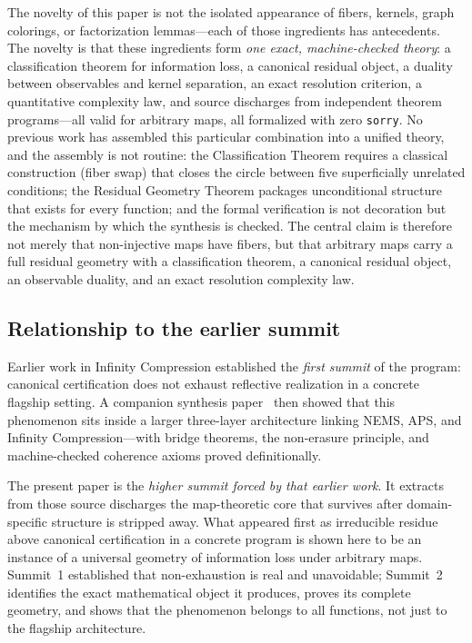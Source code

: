 \documentclass[11pt,a4paper]{article}
\theoremstyle{plain}
\theoremstyle{definition}
\theoremstyle{remark}
\begin{document}
The novelty of this paper is not the isolated appearance of fibers, kernels,
graph colorings, or factorization lemmas---each of those ingredients has
antecedents. The novelty is that these ingredients form \emph{one exact,
machine-checked theory}: a classification theorem for information loss, a
canonical residual object, a duality between observables and kernel separation,
an exact resolution criterion, a quantitative complexity law, and source
discharges from independent theorem programs---all valid for arbitrary maps,
all formalized with zero \texttt{sorry}. No previous work has assembled this
particular combination into a unified theory, and the assembly is not routine:
the Classification Theorem requires a classical construction (fiber swap) that
closes the circle between five superficially unrelated conditions; the
Residual Geometry Theorem packages unconditional structure that exists for
every function; and the formal verification is not decoration but the
mechanism by which the synthesis is checked. The central claim is therefore
not merely that non-injective maps have fibers, but that arbitrary maps carry
a full residual geometry with a classification theorem, a canonical residual
object, an observable duality, and an exact resolution complexity law.

\subsection{Relationship to the earlier summit}

Earlier work in Infinity Compression established the \emph{first summit} of
the program: canonical certification does not exhaust reflective realization
in a concrete flagship setting. A companion synthesis paper~\cite{Spivack2026-Strata} then showed that
this phenomenon sits inside a larger three-layer architecture linking NEMS,
APS, and Infinity Compression---with bridge theorems, the non-erasure
principle, and machine-checked coherence axioms proved definitionally.

The present paper is the \emph{higher summit forced by that earlier work}.
It extracts from those source discharges the map-theoretic core that survives
after domain-specific structure is stripped away. What appeared first as
irreducible residue above canonical certification in a concrete program is
shown here to be an instance of a universal geometry of information loss
under arbitrary maps. Summit~1 established that non-exhaustion is real and
unavoidable; Summit~2 identifies the exact mathematical object it produces,
proves its complete geometry, and shows that the phenomenon belongs to all
functions, not just to the flagship architecture.
\end{document}
